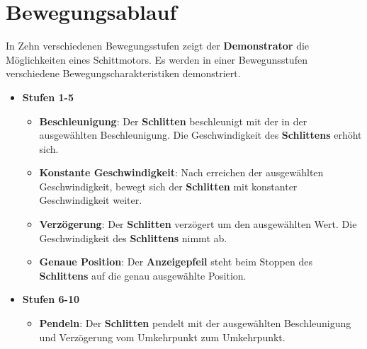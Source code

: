 %
%

\chapter{Bewegungsablauf}

In Zehn verschiedenen Bewegungsstufen zeigt der \textbf{Demonstrator} die Möglichkeiten eines Schittmotors. Es werden in einer Bewegunsstufen verschiedene Bewegungscharakteristiken demonstriert. 

\begin{itemize}
\item \textbf{Stufen 1-5}
	\begin{itemize}
\item\textbf{Beschleunigung}: Der \textbf{Schlitten} beschleunigt mit der in der ausgewählten Beschleunigung. Die Geschwindigkeit des \textbf{Schlittens} erhöht sich. 
	
	\item\textbf{Konstante Geschwindigkeit}: Nach erreichen der ausgewählten Geschwindigkeit, bewegt sich der \textbf{Schlitten} mit konstanter Geschwindigkeit weiter.
		
		\item\textbf{Verzögerung}: Der \textbf{Schlitten} verzögert um den ausgewählten Wert. Die Geschwindigkeit des \textbf{Schlittens} nimmt ab.
			
			\item\textbf{Genaue Position}: Der \textbf{Anzeigepfeil} steht beim Stoppen des \textbf{Schlittens} auf die genau ausgewählte Position.
\end{itemize}
\end{itemize}
\begin{itemize}
	\item \textbf{Stufen 6-10}
	\begin{itemize}
	\item\textbf{Pendeln}: Der \textbf{Schlitten} pendelt mit der ausgewählten Beschleunigung und Verzögerung vom Umkehrpunkt zum Umkehrpunkt.
\end{itemize}
\end{itemize}			
	